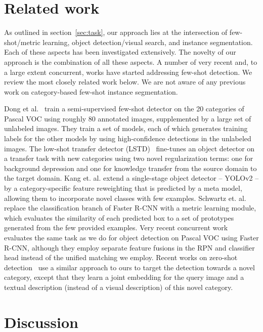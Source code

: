 \documentclass{article}
\begin{document}
\section{Related work}
\label{sec:related_work}

As outlined in section~\ref{sec:task}, our approach lies at the intersection of few-shot/metric learning, object detection/visual search, and instance segmentation. Each of these aspects has been investigated extensively. The novelty of our approach is the combination of all these aspects. A number of very recent and, to a large extent concurrent, works have started addressing few-shot detection. We review the most closely related work below. We are not aware of any previous work on category-based few-shot instance segmentation.

Dong et al.~\cite{Dong2018} train a semi-supervised few-shot detector on the 20 categories of Pascal VOC using roughly 80 annotated images, supplemented by a large set of unlabeled images. They train a set of models, each of which generates training labels for the other models by using high-confidence detections in the unlabeled images.
The low-shot transfer detector (LSTD)~\cite{Chen2018} fine-tunes an object detector on a transfer task with new categories using two novel regularization terms: one for background depression and one for knowledge transfer from the source domain to the target domain.
Kang et. al. \cite{kang2018few} extend a single-stage object detector -- YOLOv2 \cite{Redmon2017} -- by a category-specific feature reweighting that is predicted by a meta model, allowing them to incorporate novel classes with few examples.
Schwartz et. al. \cite{Schwartz2018a} replace the classification branch of Faster R-CNN with a metric learning module, which evaluates the similarity of each predicted box to a set of prototypes generated from the few provided examples. 
Very recent concurrent work~\cite{Zhang2019} evaluates the same task as we do for object detection on Pascal VOC using Faster R-CNN, although they employ separate feature fusions in the RPN and classifier head instead of the unified matching we employ.
Recent works on zero-shot detection~\cite{Bansal2018, Rahman2018, Demirel2018, zhu2019} use a similar approach to ours to target the detection towards a novel category, except that they learn a joint embedding for the query image and a textual description (instead of a visual description) of this novel category.




\section{Discussion}
\label{sec:discussion}
\end{document}
